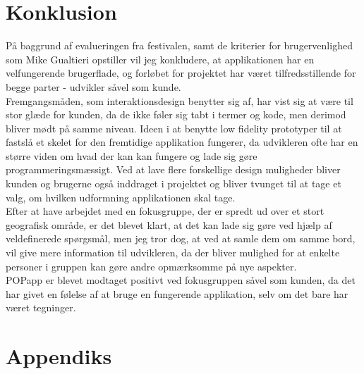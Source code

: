 \documentclass[a4paper,10pt,titlepage]{article}
\begin{document}
\section{Konklusion}
På baggrund af evalueringen fra festivalen, samt de kriterier for brugervenlighed som Mike Gualtieri opstiller vil jeg konkludere, at applikationen har en velfungerende brugerflade, og forløbet for projektet har været tilfredsstillende for begge parter - udvikler såvel som kunde.\\
Fremgangsmåden, som interaktionsdesign benytter sig af, har vist sig at være til stor glæde for kunden, da de ikke føler sig tabt i termer og kode, men derimod bliver mødt på samme niveau. Ideen i at benytte low fidelity prototyper til at fastslå et skelet for den fremtidige applikation fungerer, da udvikleren ofte har en større viden om hvad der kan kan fungere og lade sig gøre programmeringsmæssigt. Ved at lave flere forskellige design muligheder bliver kunden og brugerne også inddraget i projektet og bliver tvunget til at tage et valg, om hvilken udformning applikationen skal tage.\\
Efter at have arbejdet med en fokusgruppe, der er spredt ud over et stort geografisk område, er det blevet klart, at det kan lade sig gøre ved hjælp af veldefinerede spørgsmål, men jeg tror dog, at ved at samle dem om samme bord, vil give mere information til udvikleren, da der bliver mulighed for at enkelte personer i gruppen kan gøre andre opmærksomme på nye aspekter.\\
POPapp er blevet modtaget positivt ved fokusgruppen såvel som kunden, da det har givet en følelse af at bruge en fungerende applikation, selv om det bare har været tegninger.
\newpage

\printbibliography[type=book, title={Bøger}]
\printbibliography[type=article, title={Artikler}]
\printbibliography[nottype=book, nottype=article, title={Hjemmesider}]

\newpage
\section{Appendiks}
\end{document}
